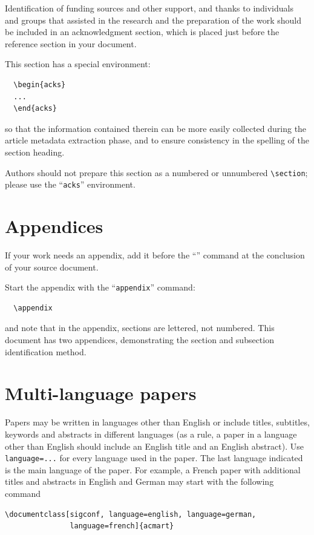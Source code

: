 Identification of funding sources and other support, and thanks to
individuals and groups that assisted in the research and the
preparation of the work should be included in an acknowledgment
section, which is placed just before the reference section in your
document.

This section has a special environment:
\begin{verbatim}
  \begin{acks}
  ...
  \end{acks}
\end{verbatim}
so that the information contained therein can be more easily collected
during the article metadata extraction phase, and to ensure
consistency in the spelling of the section heading.

Authors should not prepare this section as a numbered or unnumbered {\verb|\section|}; please use the ``{\verb|acks|}'' environment.

\section{Appendices}

If your work needs an appendix, add it before the
``\verb||'' command at the conclusion of your source
document.

Start the appendix with the ``\verb|appendix|'' command:
\begin{verbatim}
  \appendix
\end{verbatim}
and note that in the appendix, sections are lettered, not
numbered. This document has two appendices, demonstrating the section
and subsection identification method.

\section{Multi-language papers}

Papers may be written in languages other than English or include
titles, subtitles, keywords and abstracts in different languages (as a
rule, a paper in a language other than English should include an
English title and an English abstract).  Use \verb|language=...| for
every language used in the paper.  The last language indicated is the
main language of the paper.  For example, a French paper with
additional titles and abstracts in English and German may start with
the following command
\begin{verbatim}
\documentclass[sigconf, language=english, language=german,
               language=french]{acmart}
\end{verbatim}

